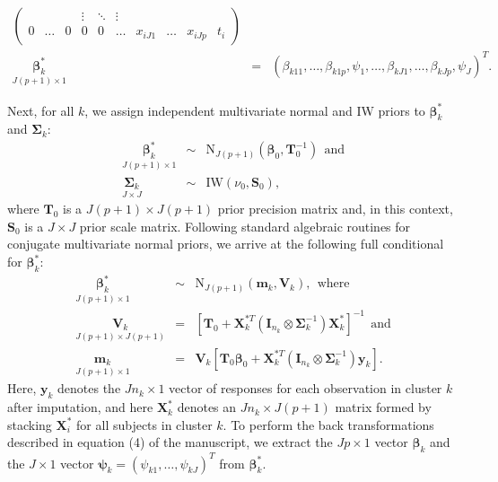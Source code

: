 \documentclass[useAMS,11pt]{article}
\newcommand{\1}{\mathbbm{1}}
\begin{document}
\begin{enumerate}
\begin{enumerate}
\begin{enumerate}
\begin{eqnarray*}
\begin{pmatrix}
                                                     &        &          & \vdots & \ddots  & \vdots           &          &         &         &       \\
                                             0       & \ldots & 0        & 0      &  0      &  \ldots          &  x_{iJ1} & \ldots  & x_{iJp} & t_i
                              \end{pmatrix}\\[8pt]
               \underset{J(p+1) \times 1}{\boldsymbol\beta^*_k}&=&(\beta_{k11},\ldots,\beta_{k1p},\psi_1,\ldots,\beta_{kJ1},\ldots,\beta_{kJp},\psi_J)^T.
               \end{eqnarray*}

           Next, for all $k$, we assign independent multivariate normal and IW priors to $\boldsymbol\beta^*_k$ and $\boldsymbol\Sigma_k$:
           \begin{eqnarray*}
           \underset{J(p+1) \times 1}{\boldsymbol\beta^*_k}&\sim& \text{N}_{J(p+1)}\left(\boldsymbol\beta_0,\mathbf{T}_0^{-1}\right)~~\text{and}\\
          \underset{J\times J}{\boldsymbol\Sigma_k}&\sim& \text{IW}(\nu_0,\mathbf{S}_0),
           \end{eqnarray*}
           where $\mathbf{T}_0$ is a $J(p+1)\times J(p+1)$ prior precision matrix and, in this context, $\mathbf{S}_0$ is a $J\times J$ prior scale matrix. Following standard algebraic routines for conjugate multivariate normal priors, we arrive at the following full conditional for $\boldsymbol\beta^*_k$:
           \begin{eqnarray*}
           \underset{J(p+1) \times 1}{\boldsymbol\beta^*_k}&\sim& \text{N}_{J(p+1)}\left(\mathbf{m}_k,\mathbf{V}_k\right),~~\text{where}\\
           \underset{J(p+1)\times J(p+1)}{\mathbf{V}_k}&=&\left[\mathbf{T}_0+\mathbf{X}^{*T}_k\left(\mathbf{I}_{n_k}\otimes\boldsymbol\Sigma^{-1}_k\right)\mathbf{X}^*_k\right]^{-1} ~~\text{and}\\
           \underset{J(p+1)\times 1}{\mathbf{m}_k}&=&\mathbf{V}_k\left[\mathbf{T}_0\boldsymbol\beta_0 + \mathbf{X}^{*T}_k\left(\mathbf{I}_{n_k}\otimes\boldsymbol\Sigma^{-1}_k\right)\mathbf{y}_k\right].
            \end{eqnarray*}
           Here, $\mathbf{y}_k$ denotes the $Jn_k\times 1$ vector of responses for each observation in cluster $k$ after imputation, and here $\mathbf{X}^*_k$ denotes an $Jn_k \times J(p+1)$ matrix formed by stacking $\mathbf{X}^*_i$ for all subjects in cluster $k$. To perform the back transformations described in equation (4) of the manuscript, we extract the $Jp\times 1$ vector $\boldsymbol\beta_k$ and the $J\times 1 $ vector $\boldsymbol\psi_k=(\psi_{k1},\ldots,\psi_{kJ})^T$ from $\boldsymbol\beta^*_k$.\vspace{4pt}


\end{enumerate}
\end{enumerate}
\end{enumerate}
\end{document}
